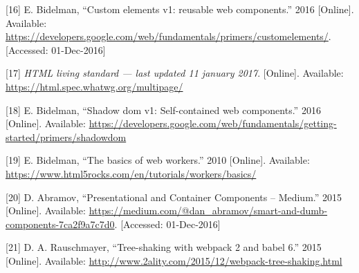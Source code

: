 \documentclass[]{article}
\begin{document}
\hypertarget{ref-Bidelman2016}{}
{[}16{]} E. Bidelman, ``Custom elements v1: reusable web components.''
2016 {[}Online{]}. Available:
\url{https://developers.google.com/web/fundamentals/primers/customelements/}.
{[}Accessed: 01-Dec-2016{]}

\hypertarget{ref-HTML}{}
{[}17{]} \emph{HTML living standard --- last updated 11 january 2017}.
{[}Online{]}. Available: \url{https://html.spec.whatwg.org/multipage/}

\hypertarget{ref-Bidelman2016shadow}{}
{[}18{]} E. Bidelman, ``Shadow dom v1: Self-contained web components.''
2016 {[}Online{]}. Available:
\url{https://developers.google.com/web/fundamentals/getting-started/primers/shadowdom}

\hypertarget{ref-Bidelman2010}{}
{[}19{]} E. Bidelman, ``The basics of web workers.'' 2010 {[}Online{]}.
Available: \url{https://www.html5rocks.com/en/tutorials/workers/basics/}

\hypertarget{ref-Abramov2015}{}
{[}20{]} D. Abramov, ``Presentational and Container Components --
Medium.'' 2015 {[}Online{]}. Available:
\url{https://medium.com/@dan_abramov/smart-and-dumb-components-7ca2f9a7c7d0}.
{[}Accessed: 01-Dec-2016{]}

\hypertarget{ref-Rauschmayer2015}{}
{[}21{]} D. A. Rauschmayer, ``Tree-shaking with webpack 2 and babel 6.''
2015 {[}Online{]}. Available:
\url{http://www.2ality.com/2015/12/webpack-tree-shaking.html}
\end{document}
